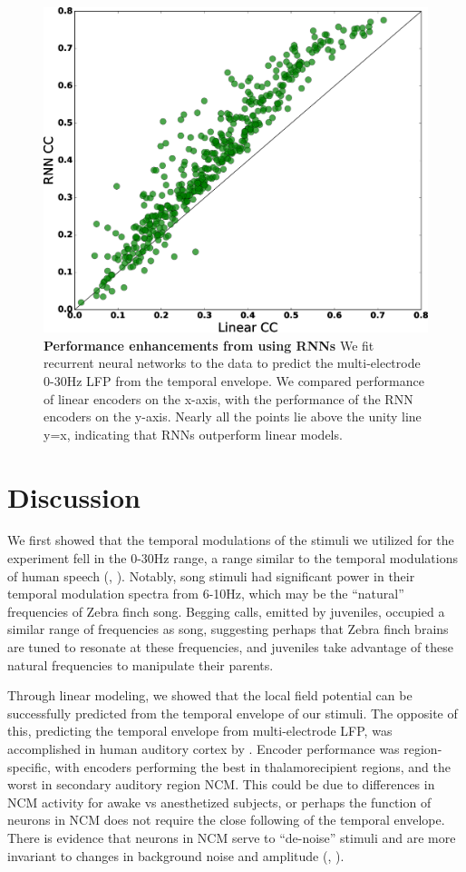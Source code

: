 \begin{figure}
    \caption{\textbf{Performance enhancements from using RNNs}  We fit recurrent neural networks to the data to predict the multi-electrode 0-30Hz LFP from the temporal envelope. We compared performance of linear encoders on the x-axis, with the performance of the RNN encoders on the y-axis. Nearly all the points lie above the unity line y=x, indicating that RNNs outperform linear models.
}
    \centering
    \includegraphics[scale=0.25]{figure_2_5.eps}
\end{figure}


\section{Discussion}

We first showed that the temporal modulations of the stimuli we utilized for the experiment fell in the 0-30Hz range, a range similar to the temporal modulations of human speech (\cite{Aiken2008}, \cite{Ding2016}). Notably, song stimuli had significant power in their temporal modulation spectra from 6-10Hz, which may be the ``natural'' frequencies of Zebra finch song. Begging calls, emitted by juveniles, occupied a similar range of frequencies as song, suggesting perhaps that Zebra finch brains are tuned to resonate at these frequencies, and juveniles take advantage of these natural frequencies to manipulate their parents.

Through linear modeling, we showed that the local field potential can be successfully predicted from the temporal envelope of our stimuli. The opposite of this, predicting the temporal envelope from multi-electrode LFP, was accomplished in human auditory cortex by \cite{Pasley2012}. Encoder performance was region-specific, with encoders performing the best in thalamorecipient regions, and the worst in secondary auditory region NCM. This could be due to differences in NCM activity for awake vs anesthetized subjects, or perhaps the function of neurons in NCM does not require the close following of the temporal envelope. There is evidence that neurons in NCM serve to ``de-noise'' stimuli and are more invariant to changes in background noise and amplitude (\cite{Schneider2013}, \cite{Moore2013}).

